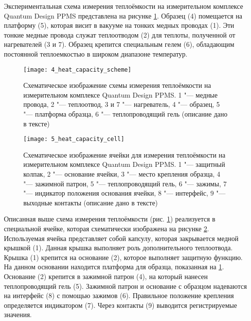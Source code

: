 Экспериментальная схема измерения теплоёмкости на измерительном комплексе Quantum Design PPMS представлена на рисунке \ref{img:figure2}. Образец (4) помещается на платформу (5), которая висит в вакууме на тонких медных проводах (1). Эти тонкие медные провода служат теплоотводом (2) для теплоты, полученной от нагревателей (3 и 7). Образец крепится специальным гелем (6), обладающим постоянной теплоемкостью в широком диапазоне температур.
\begin{figure}[ht]
  \begin{minipage}[ht]{0.99\linewidth}\centering
    \texttt{[image: 4\_heat\_capacity\_scheme]}
  \end{minipage}
       \caption[Схематическое изображение схемы измерения теплоёмкости на измерительном комплексе Quantum Design PPMS]{Схематическое изображение схемы измерения теплоёмкости на измерительном комплексе Quantum Design PPMS. 1 "--- медные провода, 2 "--- теплоотвод, 3 и 7 "--- нагреватель, 4 "--- образец, 5 "--- платформа образца, 6 "--- теплопроводящий гель (описание дано в тексте)}
    \label{img:figure2}
\end{figure}

\begin{figure}[p!]
  \begin{minipage}[ht]{0.99\linewidth}\centering
    \texttt{[image: 5\_heat\_capacity\_cell]}
  \end{minipage}
       \caption[Схематическое изображение ячейки для измерения теплоёмкости на измерительном комплексе Quantum Design PPMS]{Схематическое изображение ячейки для измерения теплоёмкости на измерительном комплексе Quantum Design PPMS. 1 "--- защитный колпак, 2 "--- основание ячейки, 3 "--- место крепления образца, 4 "--- зажимной патрон, 5 "--- теплопроводящий гель, 6 "--- зажимы, 7 "--- индикатор положения основания ячейки, 8 "--- интерфейс, 9 "--- выходные контакты (описание дано в тексте)}
    \label{img:figure3}
\end{figure}


Описанная выше схема измерения теплоёмкости (рис. \ref{img:figure2}) реализуется в специальной ячейке, которая схематически изображена на рисунке \ref{img:figure3}. Используемая ячейка представляет собой капсулу, которая закрывается медной крышкой (1). Данная крышка выполняет  роль дополнительного теплоотвода. Крышка (1) крепится на основание (2), которое выполняет защитную функцию. На данном основании находится платформа для образца, показанная на \ref{img:figure2}. Основание (2) крепится в зажимной патрон (4), на который нанесен теплопроводящий гель (5). Зажимной патрон и основание с образцом надеваются на интерфейс (8) с помощью зажимов (6). Правильное положение крепления определяется индикатором (7). Через контакты (9) выводится регистрируемые значения.

